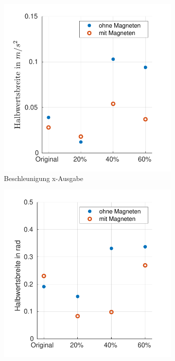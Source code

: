 \begin{figure}[tb!]
\begin{adjustwidth}{-0.1\linewidth}{-0.1\linewidth}
\begin{subfigure}[c]{.32\linewidth}
			\includegraphics[width=\linewidth]{Bilder/fwhm_BeschlX.pdf}
			\caption{Beschleunigung x-Ausgabe}
			\vspace{5pt}
		\end{subfigure}
		\hfill
		\begin{subfigure}[c]{.32\linewidth}
			\centering
			\includegraphics[width=\linewidth]{Bilder/fwhm_AngleX.pdf}

\end{subfigure}
\end{adjustwidth}
\end{figure}
